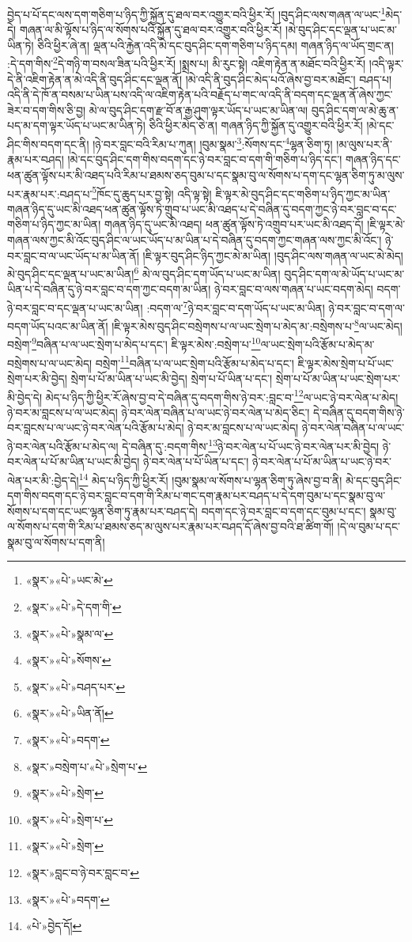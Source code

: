 བྱེད་པ་པོ་དང་ལས་དག་གཅིག་པ་ཉིད་ཀྱི་སྐྱོན་དུ་ཐལ་བར་འགྱུར་བའི་ཕྱིར་རོ། །བུད་ཤིང་ལས་གཞན་ལ་ཡང་\footnote{«སྣར་»«པེ་»ཡང་མེ་}མེད་དེ། གཞན་ལ་མི་ལྟོས་པ་ཉིད་ལ་སོགས་པའི་སྐྱོན་དུ་ཐལ་བར་འགྱུར་བའི་ཕྱིར་རོ། །མེ་བུད་ཤིང་དང་ལྡན་པ་ཡང་མ་ཡིན་ཏེ། ཅིའི་ཕྱིར་ཞེ་ན། ལྡན་པའི་རྐྱེན་འདི་མེ་དང་བུད་ཤིང་དག་གཅིག་པ་ཉིད་དམ། གཞན་ཉིད་ལ་ཡོད་གྲང་ན། :དེ་དག་གིས་\footnote{«སྣར་»«པེ་»དེ་དག་གི་}དེ་གཉི་ག་བསལ་ཟིན་པའི་ཕྱིར་རོ། །སྨྲས་པ། མི་རུང་སྟེ། འཇིག་རྟེན་ན་མཐོང་བའི་ཕྱིར་རོ། །འདི་ལྟར་དེ་ནི་འཇིག་རྟེན་ན་མེ་འདི་ནི་བུད་ཤིང་དང་ལྡན་ནོ། །མེ་འདི་ནི་བུད་ཤིང་མེད་པའོ་ཞེས་བྱ་བར་མཐོང་། བཤད་པ། འདི་ནི་དེ་ཁོ་ན་བསམ་པ་ཡིན་པས་འདི་ལ་འཇིག་རྟེན་པའི་བརྗོད་པ་གང་ལ་འདི་ནི་བདག་དང་ལྡན་ནོ་ཞེས་ཀྱང་ཟེར་བ་དག་གིས་ཅི་བྱ། མེ་ལ་བུད་ཤིང་དག་རྫ་བོ་ན་རྒྱ་ཤུག་ལྟར་ཡོད་པ་ཡང་མ་ཡིན་ལ། བུད་ཤིང་དག་ལ་མེ་ཆུ་ན་པད་མ་དག་ལྟར་ཡོད་པ་ཡང་མ་ཡིན་ཏེ། ཅིའི་ཕྱིར་མེད་ཅེ་ན། གཞན་ཉིད་ཀྱི་སྐྱོན་དུ་འགྱུར་བའི་ཕྱིར་རོ། །མེ་དང་ཤིང་གིས་བདག་དང་ནི། །ཉེ་བར་བླང་བའི་རིམ་པ་ཀུན། །བུམ་སྣམ་\footnote{«སྣར་»«པེ་»སྣམ་ལ་}:སོགས་དང་\footnote{«སྣར་»«པེ་»སོགས་}ལྷན་ཅིག་ཏུ། །མ་ལུས་པར་ནི་རྣམ་པར་བཤད། །མེ་དང་བུད་ཤིང་དག་གིས་བདག་དང་ཉེ་བར་བླང་བ་དག་གི་གཅིག་པ་ཉིད་དང་། གཞན་ཉིད་དང་ཕན་ཚུན་ལྟོས་པར་མི་འཐད་པའི་རིམ་པ་ཐམས་ཅད་བུམ་པ་དང་སྣམ་བུ་ལ་སོགས་པ་དག་དང་ལྷན་ཅིག་ཏུ་མ་ལུས་པར་རྣམ་པར་:བཤད་པ་\footnote{«སྣར་»«པེ་»བཤད་པར་}ཁོང་དུ་ཆུད་པར་བྱ་སྟེ། འདི་ལྟ་སྟེ། ཇི་ལྟར་མེ་བུད་ཤིང་དང་གཅིག་པ་ཉིད་ཀྱང་མ་ཡིན་གཞན་ཉིད་དུ་ཡང་མི་འཐད་ཕན་ཚུན་ལྟོས་ཏེ་གྲུབ་པ་ཡང་མི་འཐད་པ་དེ་བཞིན་དུ་བདག་ཀྱང་ཉེ་བར་བླང་བ་དང་གཅིག་པ་ཉིད་ཀྱང་མ་ཡིན། གཞན་ཉིད་དུ་ཡང་མི་འཐད། ཕན་ཚུན་ལྟོས་ཏེ་འགྲུབ་པར་ཡང་མི་འཐད་དོ། །ཇི་ལྟར་མེ་གཞན་ལས་ཀྱང་མི་འོང་བུད་ཤིང་ལ་ཡང་ཡོད་པ་མ་ཡིན་པ་དེ་བཞིན་དུ་བདག་ཀྱང་གཞན་ལས་ཀྱང་མི་འོང་། ཉེ་བར་བླང་བ་ལ་ཡང་ཡོད་པ་མ་ཡིན་ནོ། །ཇི་ལྟར་བུད་ཤིང་ཉིད་ཀྱང་མེ་མ་ཡིན། །བུད་ཤིང་ལས་གཞན་ལ་ཡང་མེ་མེད། མེ་བུད་ཤིང་དང་ལྡན་པ་ཡང་མ་ཡིན།\footnote{«སྣར་»«པེ་»ཡིན་ནོ།} མེ་ལ་བུད་ཤིང་དག་ཡོད་པ་ཡང་མ་ཡིན། བུད་ཤིང་དག་ལ་མེ་ཡོད་པ་ཡང་མ་ཡིན་པ་དེ་བཞིན་དུ་ཉེ་བར་བླང་བ་དག་ཀྱང་བདག་མ་ཡིན། ཉེ་བར་བླང་བ་ལས་གཞན་པ་ཡང་བདག་མེད། བདག་ཉེ་བར་བླང་བ་དང་ལྡན་པ་ཡང་མ་ཡིན། :བདག་ལ་\footnote{«སྣར་»«པེ་»བདག་}ཉེ་བར་བླང་བ་དག་ཡོད་པ་ཡང་མ་ཡིན། ཉེ་བར་བླང་བ་དག་ལ་བདག་ཡོད་པའང་མ་ཡིན་ནོ། །ཇི་ལྟར་མེས་བུད་ཤིང་བསྲེགས་པ་ལ་ཡང་སྲེག་པ་མེད་མ་:བསྲེགས་པ་\footnote{«སྣར་»བསྲེག་པ་«པེ་»སྲེག་པ་}ལ་ཡང་མེད། བསྲེག་\footnote{«སྣར་»«པེ་»སྲེག་}བཞིན་པ་ལ་ཡང་སྲེག་པ་མེད་པ་དང་། ཇི་ལྟར་མེས་:བསྲེག་པ་\footnote{«སྣར་»«པེ་»སྲེག་པ་}ལ་ཡང་སྲེག་པའི་རྩོམ་པ་མེད་མ་བསྲེགས་པ་ལ་ཡང་མེད། བསྲེག་\footnote{«སྣར་»«པེ་»སྲེག་}བཞིན་པ་ལ་ཡང་སྲེག་པའི་རྩོམ་པ་མེད་པ་དང་། ཇི་ལྟར་མེས་སྲེག་པ་པོ་ཡང་སྲེག་པར་མི་བྱེད། སྲེག་པ་པོ་མ་ཡིན་པ་ཡང་མི་བྱེད། སྲེག་པ་པོ་ཡིན་པ་དང་། སྲེག་པ་པོ་མ་ཡིན་པ་ཡང་སྲེག་པར་མི་བྱེད་དེ། མེད་པ་ཉིད་ཀྱི་ཕྱིར་རོ་ཞེས་བྱ་བ་དེ་བཞིན་དུ་བདག་གིས་ཉེ་བར་:བླང་བ་\footnote{«སྣར་»བླང་བ་ཉེ་བར་བླང་བ་}ལ་ཡང་ཉེ་བར་ལེན་པ་མེད། ཉེ་བར་མ་བླངས་པ་ལ་ཡང་མེད། ཉེ་བར་ལེན་བཞིན་པ་ལ་ཡང་ཉེ་བར་ལེན་པ་མེད་ཅིང་། དེ་བཞིན་དུ་བདག་གིས་ཉེ་བར་བླངས་པ་ལ་ཡང་ཉེ་བར་ལེན་པའི་རྩོམ་པ་མེད། ཉེ་བར་མ་བླངས་པ་ལ་ཡང་མེད། ཉེ་བར་ལེན་བཞིན་པ་ལ་ཡང་ཉེ་བར་ལེན་པའི་རྩོམ་པ་མེད་ལ། དེ་བཞིན་དུ་:བདག་གིས་\footnote{«སྣར་»«པེ་»བདག་}ཉེ་བར་ལེན་པ་པོ་ཡང་ཉེ་བར་ལེན་པར་མི་བྱེད། ཉེ་བར་ལེན་པ་པོ་མ་ཡིན་པ་ཡང་མི་བྱེད། ཉེ་བར་ལེན་པ་པོ་ཡིན་པ་དང་། ཉེ་བར་ལེན་པ་པོ་མ་ཡིན་པ་ཡང་ཉེ་བར་ལེན་པར་མི་:བྱེད་དེ།\footnote{«པེ་»བྱེད་དོ།} མེད་པ་ཉིད་ཀྱི་ཕྱིར་རོ། །བུམ་སྣམ་ལ་སོགས་པ་ལྷན་ཅིག་ཏུ་ཞེས་བྱ་བ་ནི། མེ་དང་བུད་ཤིང་དག་གིས་བདག་དང་ཉེ་བར་བླང་བ་དག་གི་རིམ་པ་གང་དག་རྣམ་པར་བཤད་པ་དེ་དག་བུམ་པ་དང་སྣམ་བུ་ལ་སོགས་པ་དག་དང་ཡང་ལྷན་ཅིག་ཏུ་རྣམ་པར་བཤད་དེ། བདག་དང་ཉེ་བར་བླང་བ་དག་དང་བུམ་པ་དང་། སྣམ་བུ་ལ་སོགས་པ་དག་གི་རིམ་པ་ཐམས་ཅད་མ་ལུས་པར་རྣམ་པར་བཤད་དོ་ཞེས་བྱ་བའི་ཐ་ཚིག་གོ། །དེ་ལ་བུམ་པ་དང་སྣམ་བུ་ལ་སོགས་པ་དག་ནི། 